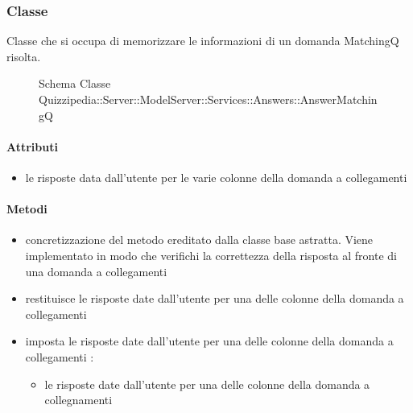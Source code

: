 \subsubsection{Classe }
Classe che si occupa di memorizzare le informazioni di un domanda MatchingQ risolta.
\begin{figure}[H]
\centering
\noindent{}
\caption[Schema Classe AnswerMatchingQ]{Schema Classe Quizzipedia::Server::ModelServer::Services::Answers::AnswerMatchingQ}
\end{figure}
\paragraph{Attributi}
\begin{itemize}
\item {}
\newline
le risposte data dall'utente per le varie colonne della domanda a collegamenti
\end{itemize}
\paragraph{Metodi}
\begin{itemize}
\item {}
\newline
concretizzazione del metodo ereditato dalla classe base astratta. Viene implementato in modo che verifichi la correttezza della risposta al fronte di una domanda a collegamenti
\newline
\item {}
\newline
restituisce le risposte date dall'utente per una delle colonne della domanda a collegamenti
\newline
\item {}
\newline
imposta le risposte date dall'utente per una delle colonne della domanda a collegamenti
\newline
{} :
\begin{itemize}
\item {}
\newline
le risposte date dall'utente per una delle colonne della domanda a collegnamenti
\end{itemize}
\end{itemize}
